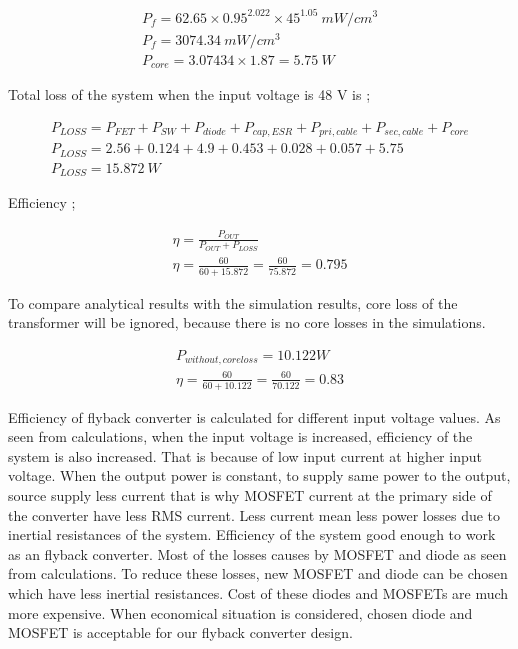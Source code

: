  \begin{align}
     P_f = 62.65\times 0.95^2.022 \times 45^1.05\ mW/cm^3\\
     P_f = 3074.34\ mW/cm^3 \\
     P_{core} = 3.07434 \times 1.87 = 5.75\ W
 \end{align}
 
 Total loss of the system when the input voltage is 48 V is ;
 
 \begin{align}
    P_{LOSS}= P_{FET} + P_{SW} + P_{diode} + P_{cap,ESR} + P_{pri,cable} + P_{sec,cable} + P_{core} \\
   P_{LOSS} = 2.56 + 0.124 + 4.9 + 0.453 + 0.028 + 0.057 + 5.75 \\
    P_{LOSS} = 15.872\ W 
 \end{align}
 
 Efficiency ;
 
 \begin{align}
     \eta = \frac{P_{OUT}}{P_{OUT}+P_{LOSS}}\\
     \eta = \frac{60}{60+15.872} = \frac{60}{75.872} = 0.795
 \end{align}
 
 To compare analytical results with the simulation results, core loss of the transformer will be ignored, because there is no core losses in the simulations. 
 
 \begin{align}
     P_{without,coreloss} = 10.122W \\
     \eta = \frac{60}{60+10.122} = \frac{60}{70.122} = 0.83
 \end{align}

Efficiency of flyback converter is calculated for different input voltage values. As seen from calculations, when the input voltage is increased, efficiency of the system is also increased. That is because of low input current at higher input voltage. When the output power is constant, to supply same power to the output, source supply less current that is why MOSFET current at the primary side of the converter have less RMS current. Less current mean less power losses due to inertial resistances of the system. Efficiency of the system good enough to work as an flyback converter. Most of the losses causes by MOSFET and diode as seen from calculations. To reduce these losses, new MOSFET and diode can be chosen which have less inertial resistances. Cost of these diodes and MOSFETs are much more expensive. When economical situation is considered, chosen diode and MOSFET is acceptable for our flyback converter design. 

